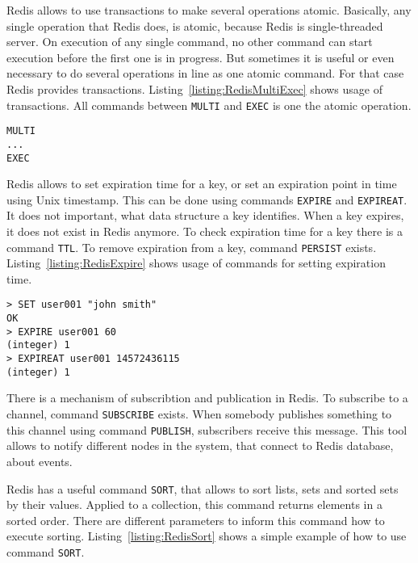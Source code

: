 
Redis allows to use transactions to make several operations atomic.
Basically, any single operation that Redis does, is atomic, because Redis is single-threaded server.
On execution of any single command, no other command can start execution before the first one is in progress.
But sometimes it is useful or even necessary to do several operations in line as one atomic command.
For that case Redis provides transactions.
Listing~\ref{listing:RedisMultiExec} shows usage of transactions.
All commands between \lstinline{MULTI} and \lstinline{EXEC} is one the atomic operation.

\begin{lstlisting}[float=h, caption=Usage of commands MULTI and EXEC., label=listing:RedisMultiExec]
MULTI
...
EXEC
\end{lstlisting}

Redis allows to set expiration time for a key, or set an expiration point in time using Unix timestamp.
This can be done using commands \lstinline{EXPIRE} and \lstinline{EXPIREAT}.
It does not important, what data structure a key identifies.
When a key expires, it does not exist in Redis anymore.
To check expiration time for a key there is a command \lstinline{TTL}.
To remove expiration from a key, command \lstinline{PERSIST} exists.
Listing~\ref{listing:RedisExpire} shows usage of commands for setting expiration time.

\begin{lstlisting}[float=h, caption=Usage of commands EXPIRE and EXPIREAT., label=listing:RedisExpire]
> SET user001 "john smith"
OK
> EXPIRE user001 60
(integer) 1
> EXPIREAT user001 14572436115
(integer) 1
\end{lstlisting}

There is a mechanism of subscribtion and publication in Redis.
To subscribe to a channel, command \lstinline{SUBSCRIBE} exists.
When somebody publishes something to this channel using command \lstinline{PUBLISH}, subscribers receive this message.
This tool allows to notify different nodes in the system, that connect to Redis database, about events.

Redis has a useful command \lstinline{SORT}, that allows to sort lists, sets and sorted sets by their values.
Applied to a collection, this command returns elements in a sorted order.
There are different parameters to inform this command how to execute sorting.
Listing~\ref{listing:RedisSort} shows a simple example of how to use command \lstinline{SORT}.

